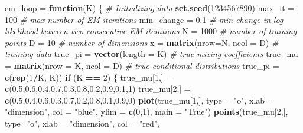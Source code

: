\documentclass[]{article}
\newenvironment{Shaded}{\begin{snugshade}}{\end{snugshade}}
\newcommand{\KeywordTok}[1]{\textcolor[rgb]{0.13,0.29,0.53}{\textbf{#1}}}
\newcommand{\DataTypeTok}[1]{\textcolor[rgb]{0.13,0.29,0.53}{#1}}
\newcommand{\DecValTok}[1]{\textcolor[rgb]{0.00,0.00,0.81}{#1}}
\newcommand{\FloatTok}[1]{\textcolor[rgb]{0.00,0.00,0.81}{#1}}
\newcommand{\StringTok}[1]{\textcolor[rgb]{0.31,0.60,0.02}{#1}}
\newcommand{\CommentTok}[1]{\textcolor[rgb]{0.56,0.35,0.01}{\textit{#1}}}
\newcommand{\ControlFlowTok}[1]{\textcolor[rgb]{0.13,0.29,0.53}{\textbf{#1}}}
\newcommand{\OperatorTok}[1]{\textcolor[rgb]{0.81,0.36,0.00}{\textbf{#1}}}
\newcommand{\NormalTok}[1]{#1}
\begin{document}
\begin{Shaded}
\begin{Highlighting}[]
\NormalTok{em_loop =}\StringTok{ }\ControlFlowTok{function}\NormalTok{(K) \{}
\CommentTok{# Initializing data}
\KeywordTok{set.seed}\NormalTok{(}\DecValTok{1234567890}\NormalTok{)}
\NormalTok{max_it =}\StringTok{ }\DecValTok{100} \CommentTok{# max number of EM iterations}
\NormalTok{min_change =}\StringTok{ }\FloatTok{0.1} \CommentTok{# min change in log likelihood between two consecutive EM iterations}
\NormalTok{N =}\StringTok{ }\DecValTok{1000} \CommentTok{# number of training points}
\NormalTok{D =}\StringTok{ }\DecValTok{10} \CommentTok{# number of dimensions}
\NormalTok{x =}\StringTok{ }\KeywordTok{matrix}\NormalTok{(}\DataTypeTok{nrow=}\NormalTok{N, }\DataTypeTok{ncol =}\NormalTok{ D) }\CommentTok{# training data}
\NormalTok{true_pi =}\StringTok{ }\KeywordTok{vector}\NormalTok{(}\DataTypeTok{length =}\NormalTok{ K) }\CommentTok{# true mixing coefficients}
\NormalTok{true_mu =}\StringTok{ }\KeywordTok{matrix}\NormalTok{(}\DataTypeTok{nrow =}\NormalTok{ K, }\DataTypeTok{ncol =}\NormalTok{ D) }\CommentTok{# true conditional distributions}
\NormalTok{true_pi =}\StringTok{ }\KeywordTok{c}\NormalTok{(}\KeywordTok{rep}\NormalTok{(}\DecValTok{1}\OperatorTok{/}\NormalTok{K, K))}
\ControlFlowTok{if}\NormalTok{ (K }\OperatorTok{==}\StringTok{ }\DecValTok{2}\NormalTok{) \{}
\NormalTok{true_mu[}\DecValTok{1}\NormalTok{,] =}\StringTok{ }\KeywordTok{c}\NormalTok{(}\FloatTok{0.5}\NormalTok{,}\FloatTok{0.6}\NormalTok{,}\FloatTok{0.4}\NormalTok{,}\FloatTok{0.7}\NormalTok{,}\FloatTok{0.3}\NormalTok{,}\FloatTok{0.8}\NormalTok{,}\FloatTok{0.2}\NormalTok{,}\FloatTok{0.9}\NormalTok{,}\FloatTok{0.1}\NormalTok{,}\DecValTok{1}\NormalTok{)}
\NormalTok{true_mu[}\DecValTok{2}\NormalTok{,] =}\StringTok{ }\KeywordTok{c}\NormalTok{(}\FloatTok{0.5}\NormalTok{,}\FloatTok{0.4}\NormalTok{,}\FloatTok{0.6}\NormalTok{,}\FloatTok{0.3}\NormalTok{,}\FloatTok{0.7}\NormalTok{,}\FloatTok{0.2}\NormalTok{,}\FloatTok{0.8}\NormalTok{,}\FloatTok{0.1}\NormalTok{,}\FloatTok{0.9}\NormalTok{,}\DecValTok{0}\NormalTok{)}
\KeywordTok{plot}\NormalTok{(true_mu[}\DecValTok{1}\NormalTok{,], }\DataTypeTok{type =} \StringTok{"o"}\NormalTok{, }\DataTypeTok{xlab =} \StringTok{"dimension"}\NormalTok{, }\DataTypeTok{col =} \StringTok{"blue"}\NormalTok{,}
\DataTypeTok{ylim =} \KeywordTok{c}\NormalTok{(}\DecValTok{0}\NormalTok{,}\DecValTok{1}\NormalTok{), }\DataTypeTok{main =} \StringTok{"True"}\NormalTok{)}
\KeywordTok{points}\NormalTok{(true_mu[}\DecValTok{2}\NormalTok{,], }\DataTypeTok{type=}\StringTok{"o"}\NormalTok{, }\DataTypeTok{xlab =} \StringTok{"dimension"}\NormalTok{, }\DataTypeTok{col =} \StringTok{"red"}\NormalTok{,}

\end{Highlighting}
\end{Shaded}
\end{document}
